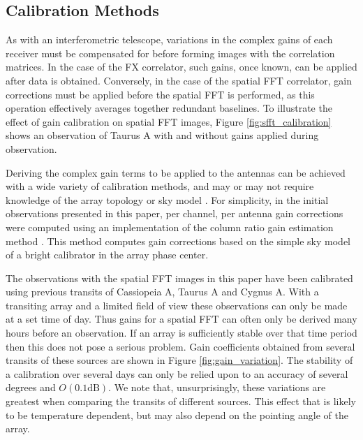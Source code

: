 \documentclass[useAMS,macros,usenatbib,onecolumn]{mn2e}
\begin{document}
\subsection{Calibration Methods}
\label{calibration}

As with an interferometric telescope, variations in the complex gains of each receiver must be compensated for before forming images with the correlation matrices.
In the case of the FX correlator, such gains, once known,  can be applied after data is obtained.
Conversely, in the case of the spatial FFT correlator, gain corrections must be applied before the spatial FFT is performed, as this operation effectively averages together redundant baselines.
To illustrate the effect of gain calibration on spatial FFT images, Figure \ref{fig:sfft_calibration} shows an observation of Taurus A with and without gains applied during observation.

Deriving the complex gain terms to be applied to the antennas can be achieved with a wide variety of calibration methods, and may or may not require knowledge of the array topology or sky model \citep{cal_strategies}.
For simplicity, in the initial observations presented in this paper, per channel, per antenna gain corrections were computed using an implementation of the column ratio gain estimation method \citep{gaindecomp}.
This method computes gain corrections based on the simple sky model of a bright calibrator in the array phase center.

The observations with the spatial FFT images in this paper have been calibrated using previous transits of Cassiopeia A, Taurus A and Cygnus A.
With a transiting array and a limited field of view these observations can only be made at a set time of day.
Thus gains for a spatial FFT can often only be derived many hours before an observation.
If an array is sufficiently stable over that time period then this does not pose a serious problem.
Gain coefficients obtained from several transits of these sources are shown in Figure \ref{fig:gain_variation}.
The stability of a calibration over several days can only be relied upon to an accuracy of several degrees and $O(0.1\mathrm{dB})$.
We note that, unsurprisingly, these variations are greatest when comparing the transits of different sources.
This effect that is likely to be temperature dependent, but may also depend on the pointing angle of the array.
\end{document}
